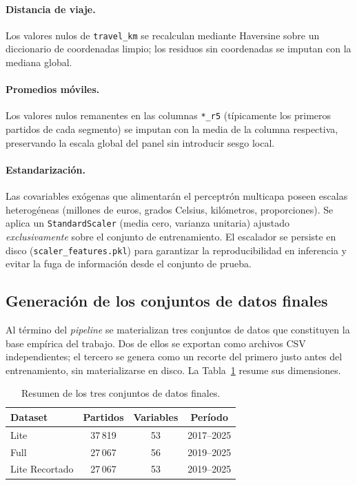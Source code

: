 \paragraph{Distancia de viaje.} Los valores nulos de \texttt{travel\_km} se recalculan mediante Haversine sobre un diccionario de coordenadas limpio; los residuos sin coordenadas se imputan con la mediana global.

\paragraph{Promedios m\'oviles.} Los valores nulos remanentes en las columnas \texttt{*\_r5} (t\'ipicamente los primeros partidos de cada segmento) se imputan con la media de la columna respectiva, preservando la escala global del panel sin introducir sesgo local.

\paragraph{Estandarizaci\'on.} Las covariables ex\'ogenas que alimentar\'an el perceptr\'on multicapa poseen escalas heterog\'eneas (millones de euros, grados Celsius, kil\'ometros, proporciones). Se aplica un \texttt{StandardScaler} (media cero, varianza unitaria) ajustado \emph{exclusivamente} sobre el conjunto de entrenamiento. El escalador se persiste en disco (\texttt{scaler\_features.pkl}) para garantizar la reproducibilidad en inferencia y evitar la fuga de informaci\'on desde el conjunto de prueba.

\subsection{Generaci\'on de los conjuntos de datos finales}
\label{subsec:datasets_finales}

Al t\'ermino del \textit{pipeline} se materializan tres conjuntos de datos que constituyen la base emp\'irica del trabajo. Dos de ellos se exportan como archivos CSV independientes; el tercero se genera como un recorte del primero justo antes del entrenamiento, sin materializarse en disco. La Tabla~\ref{tab:datasets} resume sus dimensiones.

\begin{table}[htbp]
	\centering
	\caption{Resumen de los tres conjuntos de datos finales.}
	\label{tab:datasets}
	\begin{tabular}{lccc}
		\toprule
		\textbf{Dataset} & \textbf{Partidos} & \textbf{Variables} & 
		\textbf{Per\'iodo} \\
		\midrule
		Lite & 37\,819 & 53 & 2017--2025 \\
		Full & 27\,067 & 56 & 2019--2025 \\
		Lite Recortado & 27\,067 & 53 & 2019--2025 \\
		\bottomrule
	\end{tabular}
\end{table}

